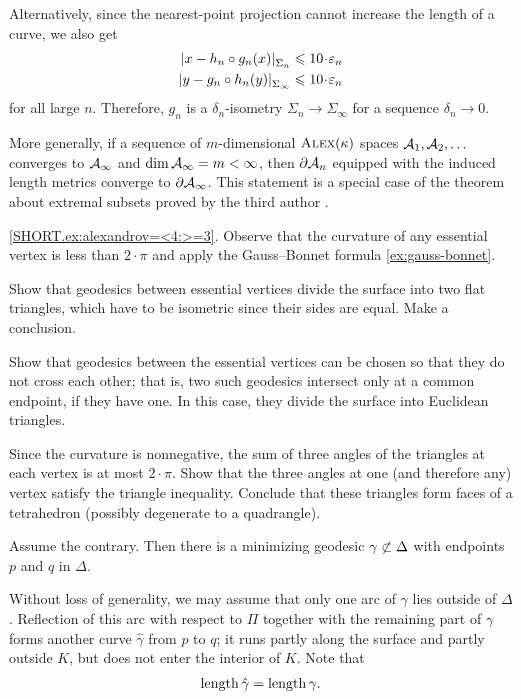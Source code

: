 Alternatively, since the nearest-point projection cannot increase the length of a curve, we also get
\begin{align*}
\dist{x}{h_n\circ g_n(x)}{\Sigma_n}&\le 10\cdot \eps_n
\\
\dist{y}{g_n\circ h_n(y)}{\Sigma_\infty}&\le 10\cdot \eps_n
\end{align*}
for all large $n$.
Therefore, $g_n$ is a $\delta_n$-isometry $\Sigma_n\to\Sigma_\infty$ for a sequence $\delta_n\to 0$.

More generally, if a sequence of $m$-dimensional $\textup{\textsc{Alex}}(\kappa)$ spaces $\mathcal{A}_1,\mathcal{A}_2,\dots$ converges to $\mathcal{A}_\infty$ and $\operatorname{\rm dim}\nolimits \mathcal{A}_\infty=m<\infty$,
then $\partial \mathcal{A}_n$ equipped with the induced length metrics converge to $\partial \mathcal{A}_\infty$.
This statement is a special case of the theorem about extremal subsets proved by the third author \cite[1.2]{petrunin1997}.

\ref{SHORT.ex:alexandrov=<4:>=3}.
Observe that the curvature of any essential vertex is less than $2\cdot\pi$ and apply the Gauss--Bonnet formula \ref{ex:gauss-bonnet}.

 Show that geodesics between essential vertices divide the surface into two flat triangles, which have to be isometric since their sides are equal.
Make a conclusion.

Show that geodesics between the essential vertices can be chosen so that they do not cross each other; that is, two such geodesics intersect only at a common endpoint, if they have one.
In this case, they divide the surface into Euclidean triangles.

Since the curvature is nonnegative, the sum of three angles of the triangles at each vertex is at most $2\cdot\pi$.
Show that the three angles at one (and therefore any) vertex satisfy the triangle inequality.
Conclude that these triangles form faces of a tetrahedron (possibly degenerate to a quadrangle).


 Assume the contrary.
Then there is a minimizing geodesic $\gamma\z{\not\subset}\Delta$ with endpoints $p$ and $q$ in $\Delta$.

Without loss of generality, we may assume that only one arc of $\gamma$ lies outside of $\Delta$.
Reflection of this arc with respect to $\Pi$ together with the remaining part of $\gamma$ forms another curve $\hat\gamma$ from $p$ to $q$;
it runs partly along the surface
and partly outside $K$,
but does not enter the interior of $K$.
Note that
\[\mathop{\rm length}\nolimits\hat\gamma=\mathop{\rm length}\nolimits\gamma.\]


